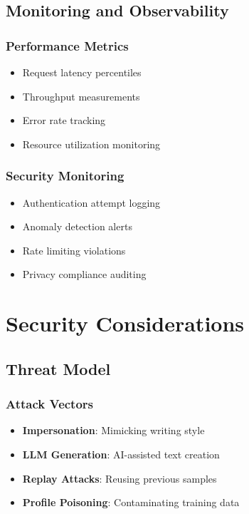 \documentclass[12pt,a4paper]{article}
\begin{document}
\subsection{Monitoring and Observability}

\subsubsection{Performance Metrics}
\begin{itemize}
    \item Request latency percentiles
    \item Throughput measurements
    \item Error rate tracking
    \item Resource utilization monitoring
\end{itemize}

\subsubsection{Security Monitoring}
\begin{itemize}
    \item Authentication attempt logging
    \item Anomaly detection alerts
    \item Rate limiting violations
    \item Privacy compliance auditing
\end{itemize}

\section{Security Considerations}

\subsection{Threat Model}

\subsubsection{Attack Vectors}
\begin{itemize}
    \item \textbf{Impersonation}: Mimicking writing style
    \item \textbf{LLM Generation}: AI-assisted text creation
    \item \textbf{Replay Attacks}: Reusing previous samples
    \item \textbf{Profile Poisoning}: Contaminating training data
\end{itemize}
\end{document}
